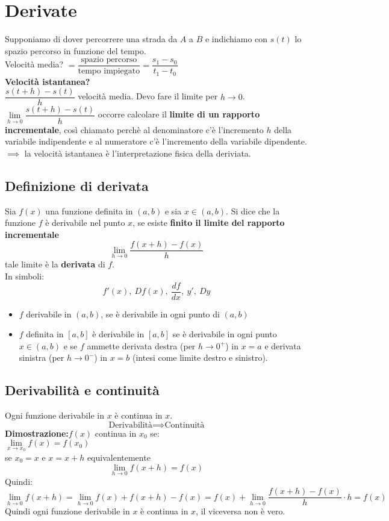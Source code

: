 \documentclass[../../main.tex]{subfiles}
\begin{document}
\section{Derivate}
Supponiamo di dover percorrere una strada da $A$ a $B$ e indichiamo con $s(t)$
lo spazio percorso in funzione del tempo.\\
Velocità media? $ = \dfrac{\text{spazio percorso}}{\text{tempo impiegato}} = \dfrac{s_1 - s_0}{t_1 - t_0}$
\vspace*{2mm}\\
\textbf{Velocità istantanea?}\\
$\dfrac{s(t+h) - s(t)}{h}$ velocità media. Devo fare il limite per $h \to 0$.\\
$\lim\limits_{h \to 0} \dfrac{s(t+h) - s(t)}{h}$ occorre calcolare il \textbf{limite di un rapporto incrementale}, così chiamato
perchè al denominatore c'è l'incremento $h$ della variabile indipendente e al numeratore c'è l'incremento della variabile dipendente.\\
$\implies$ la velocità istantanea è l'interpretazione fisica della deriviata.

\subsection{Definizione di derivata}
Sia $f(x)$ una funzione definita in $(a,b)$ e sia $x\in (a,b)$. Si dice che la funzione $f$ è derivabile
nel punto $x$, se esiste \textbf{finito il limite del rapporto incrementale}
\[
    \lim_{h\to 0} \dfrac{f(x+h) - f(x)}{h}
\]
tale limite è la \textbf{derivata} di $f$.\\
In simboli:
\[
    f'(x),\ Df(x),\ \dfrac{df}{dx},\ y',\ Dy
\]
\begin{itemize}
    \item $f$ derivabile in $(a, b)$, se è derivabile in ogni punto di $(a, b)$
    \item $f$ definita in $[a, b]$ è derivabile in $[a, b]$ se è derivabile in ogni punto $x\in(a, b)$ e se $f$ ammette derivata destra  (per $h\to 0^+$) in $x=a$
          e derivata sinistra (per $h\to 0^-$) in $x=b$ (intesi come limite destro e sinistro).
\end{itemize}

\subsection{Derivabilità e continuità}
Ogni funzione derivabile in $x$ è continua in $x$.
\[
    \text{Derivabilità} \implies \text{Continuità}
\]
\textbf{Dimostrazione:}$f(x)$ continua in $x_0$ se:\\
$\lim\limits_{x\to x_0} f(x) = f(x_0)$\\
se $x_0 = x$ e $x = x+h$ equivalentemente
\[
    \lim_{h\to 0} f(x + h) = f(x)
\]
Quindi:
\[
    \lim_{h\to 0} f(x+h) = \lim_{h\to0} f(x) + f(x+h) - f(x) = f(x) + \lim_{h\to 0} \dfrac{f(x+h) - f(x)}{h} \cdot h = f(x)
\]
Quindi ogni funzione derivabile in $x$ è continua in $x$, il viceversa non è vero.
\end{document}
